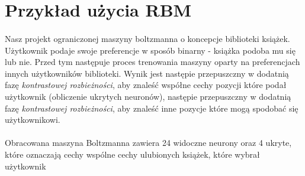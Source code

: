 \section{Przykład użycia RBM}
    \paragraph{}
	Nasz projekt ograniczonej maszyny boltzmanna o koncepcje biblioteki książek. 
	Użytkownik podaje swoje preferencje w sposób binarny - książka podoba mu się lub nie. 
	Przed tym następuje proces trenowania maszyny oparty na preferencjach innych użytkowników biblioteki. 
	Wynik jest następie przepuszczny w dodatnią fazę \textit{kontrastowej rozbieżności},
	aby znaleść współne cechy pozycji które podał użytkownik (obliczenie ukrytych neuronów),
	następie przepuszczny w dodatnią fazę \textit{kontrastowej rozbieżności}, 
	aby znaleść inne pozycje które mogą spodobać się użytkownikowi.
    \paragraph{}
	Obracowana maszyna Boltzmanna zawiera 24 widoczne neurony oraz 4 ukryte, które oznaczają cechy wspólne cechy ulubionych książek, które wybrał 				użytkownik